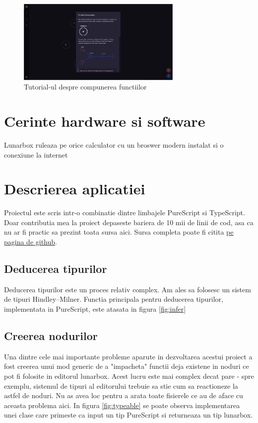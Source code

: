 \documentclass{article}
\begin{document}
\begin{figure}[h]
	\centering
	\includegraphics[width=300px]{tutorial.png}
	\caption{Tutorial-ul despre compunerea functiilor}
\end{figure}

\section{Cerinte hardware si software}
Lunarbox ruleaza pe orice calculator cu un broswer modern instalat si o conexiune la internet

\section{Descrierea aplicatiei}
Proiectul este scris intr-o combinatie dintre limbajele PureScript si TypeScript.
Doar contributia mea la proiect depaseste bariera de 10 mii de linii de cod, asa ca nu ar fi practic sa prezint toata sursa aici.
Sursa completa poate fi citita \href{https://github.com/lunarcast/lunarbox}{pe pagina de github}.

\subsection{Deducerea tipurilor}
Deducerea tipurilor este un proces relativ complex.
Am ales sa folosesc un sistem de tipuri Hindley–Milner. Functia principala pentru deducerea tipurilor, implementata in PureScript, este atasata in figura \ref{fig:infer}

\subsection{Creerea nodurilor}
Una dintre cele mai importante probleme aparute in dezvoltarea acestui proiect a fost creerea unui mod generic de a "impacheta" functii deja existene in noduri ce pot fi folosite in editorul lunarbox.
Acest lucru este mai complex decat pare - spre exemplu, sistemul de tipuri al editorului trebuie sa stie cum sa reactioneze la astfel de noduri.
Nu as avea loc pentru a arata toate fisierele ce au de aface cu aceasta problema aici.
In figura \ref{fig:typeable} se poate observa implementarea unei clase care primeste ca input un tip PureScript si returneaza un tip lunarbox.
\end{document}
